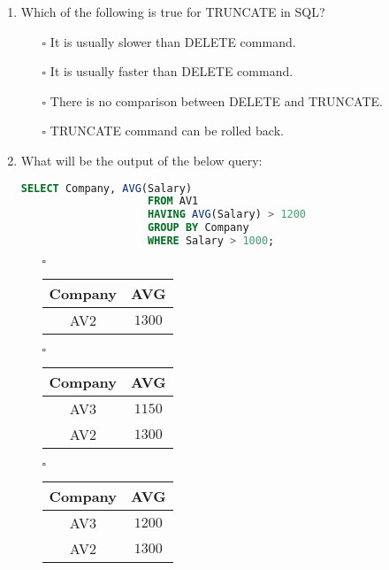 \documentclass[10pt]{article}
\newcommand{\lightrule}{%
	\arrayrulecolor{black!30}%
	\midrule[\lightrulewidth]%
	\arrayrulecolor{black}}
\begin{document}
\begin{enumerate}
			\item Which of the following is true for TRUNCATE in SQL?
			\begin{enumerate}
					\item[$\square$] It is usually slower than DELETE command.
					\item[$\square$] It is usually faster than DELETE command.
					\item[$\square$] There is no comparison between DELETE and TRUNCATE.
					\item[$\square$] TRUNCATE command can be rolled back.
				\end{enumerate}

			\item What will be the output of the below query: 
				\begin{lstlisting}[language=SQL,firstline=1, lastline=5] 
					SELECT Company, AVG(Salary) 
					FROM AV1 
					HAVING AVG(Salary) > 1200 
					GROUP BY Company 
					WHERE Salary > 1000;
				\end{lstlisting}

				\begin{enumerate}
					\item[$\square$]
						\begin{tabular}{@{} *{2}{c} @{}}
							\toprule
								\textbf{Company} & \textbf{AVG} \\
							\midrule
								AV2 & $1300$ \\
							\bottomrule
						\end{tabular}

					\item[$\square$]
						\begin{tabular}{@{} *{2}{c} @{}}
							\toprule
								\textbf{Company} & \textbf{AVG} \\
							\midrule
								AV3 & $1150$ \\
							\lightrule
								AV2 & $1300$ \\
							\bottomrule
						\end{tabular}

					\item[$\square$]
						\begin{tabular}{@{} *{2}{c} @{}}
							\toprule
								\textbf{Company} & \textbf{AVG} \\
							\midrule
								AV3 & $1200$ \\
							\lightrule
								AV2 & $1300$ \\
							\bottomrule
						\end{tabular}


\end{enumerate}
\end{enumerate}
\end{document}
